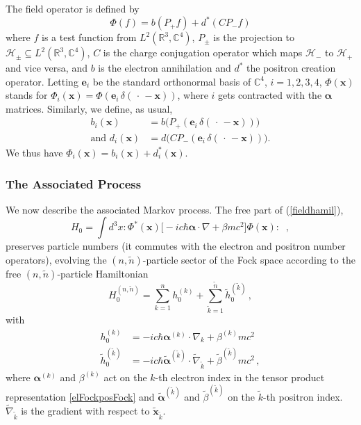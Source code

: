 \documentclass[12pt]{article}
\newcommand{\CCC}{\mathbb{C}} %
\newcommand{\RRR}{\mathbb{R}} %
\newcommand{\I}{i} %
\newcommand{\1}{\mathbf{1}} %
\newcommand{\Hilbert}{\mathscr{H}}
\newcommand{\Dindex}{i} %
\newcommand{\ve}{{\boldsymbol e}}
\newcommand{\vx}{{\boldsymbol x}} %
\newcommand{\valpha}{{\boldsymbol \alpha}}
\newcommand{\pvx}{{\widetilde{\vx}}}
\newcommand{\pn}{{\widetilde{n}}}
\newcommand{\ph}{\widetilde{h}}
\newcommand{\pk}{{\widetilde{k}}}
\newcommand{\palpha}{\widetilde\valpha}
\begin{document}
The field operator is defined by
\begin{equation}\label{Phidef}
   \Phi(f) = b(P_+ f) + d^*(CP_- f)
\end{equation}
where $f$ is a test function from $L^2(\RRR^3,\CCC^4)$, $P_\pm$ is the
projection to $\Hilbert_\pm \subseteq L^2(\RRR^3,\CCC^4)$, $C$ is the
charge conjugation operator which maps $\Hilbert_-$ to $\Hilbert_+$
and vice versa, and $b$ is the electron annihilation and $d^*$ the
positron creation operator. Letting $\ve_\Dindex$ be the standard
orthonormal basis of $\CCC^4$, $\Dindex =1,2,3,4$, $\Phi(\vx)$ stands
for $\Phi_i(\vx) = \Phi(\ve_\Dindex \, \delta(\,\cdot\, -\vx))$, where
$\Dindex$ gets contracted with the $\valpha$ matrices.  Similarly, we
define, as usual,
\begin{subequations}
\begin{align}
   b_\Dindex(\vx) &= b\Big(P_+(\ve_\Dindex \,
   \delta(\,\cdot\, - \vx)) \Big) \\
   \text{and } d_\Dindex(\vx) &= d \Big(CP_-(\ve_\Dindex \,
   \delta(\,\cdot\, - \vx)) \Big).
\end{align}
\end{subequations}
We thus have $\Phi_\Dindex(\vx) =
b_\Dindex(\vx) + d_\Dindex^*(\vx)$.


\subsubsection{The Associated Process}

We now describe the associated Markov process. The free part of
(\ref{fieldhamil}),
\[
   H_0= \int d^3 x :{\Phi^*}(\vx)\big[-\I c \hbar
   \valpha\cdot\nabla +\beta m c^2 \big]\Phi(\vx):\;\;,
\]
preserves particle numbers (it commutes with the electron and
positron number operators), evolving the $(n,\pn)$-particle sector
of the Fock space according to the free $(n,\pn)$-particle Hamiltonian
\[
   H^{(n,\pn)}_0 = \sum_{k=1}^n h^{(k)}_0 + \sum_{\pk=1}^\pn
   \ph^{(\pk)}_0\,,
\]
with
\begin{align}
   h^{(k)}_0 &= -\I c\hbar \valpha^{(k)} \cdot \nabla_k + \beta^{(k)} 
mc^2
   \nonumber\\
   \ph^{(\pk)}_0 &= -\I c\hbar \palpha^{(\pk)} \cdot 
\widetilde{\nabla}_\pk
   + \widetilde\beta^{(\pk)} mc^2\,,\nonumber
\end{align}
where $\valpha^{(k)}$ and $\beta^{(k)}$ act on the $k$-th electron
index in the tensor product representation \eqref{elFockposFock} and
$\palpha^{(\pk)}$ and $\widetilde{\beta}^{(\pk)}$ on the $\pk$-th
positron index. $\widetilde{\nabla}_\pk$ is the gradient with
respect to $\pvx_\pk$.
\end{document}
